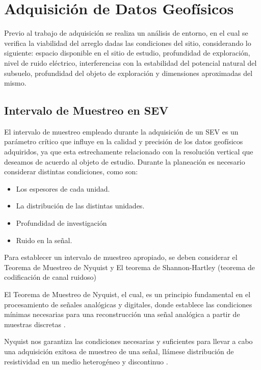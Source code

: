 	\section{Adquisición de Datos Geofísicos}
	
	Previo al trabajo de adquisición se realiza un análisis de entorno, en el cual se verifica la viabilidad del arreglo dadas las condiciones del sitio, considerando lo siguiente: espacio disponible en el sitio de estudio, profundidad de exploración, nivel de ruido eléctrico, interferencias con la estabilidad del potencial natural del subsuelo, profundidad del objeto de exploración y dimensiones aproximadas del mismo.
	
		\subsection{Intervalo de Muestreo en SEV}
			
			El intervalo de muestreo empleado durante la adquisición de un SEV es un parámetro crítico que influye en la calidad y precisión de los datos geofísicos adquiridos, ya que esta estrechamente relacionado con la resolución vertical que deseamos de acuerdo al objeto de estudio. Durante la planeación es necesario considerar distintas condiciones, como son:
			
			\begin{itemize}
				\item Los espesores de cada unidad.
				\item La distribución de las distintas unidades.
				\item Profundidad de investigación
				\item Ruido en la señal.
			\end{itemize}
			
			Para establecer un intervalo de muestreo apropiado, se deben considerar el Teorema de Muestreo de Nyquist y El teorema de Shannon-Hartley (teorema de codificación de canal ruidoso)
			
			El Teorema de Muestreo de Nyquist, el cual, es un principio fundamental en el procesamiento de señales analógicas y digitales, donde establece las condiciones mínimas necesarias para una reconstrucción una señal analógica a partir de muestras discretas \citep{alvarado2010}.
			
			Nyquist nos garantiza las condiciones necesarias y suficientes para llevar a cabo una adquisición exitosa de muestreo de una señal, llámese distribución de resistividad en un medio heterogéneo y discontinuo \citep{alvarado2010}.
			
